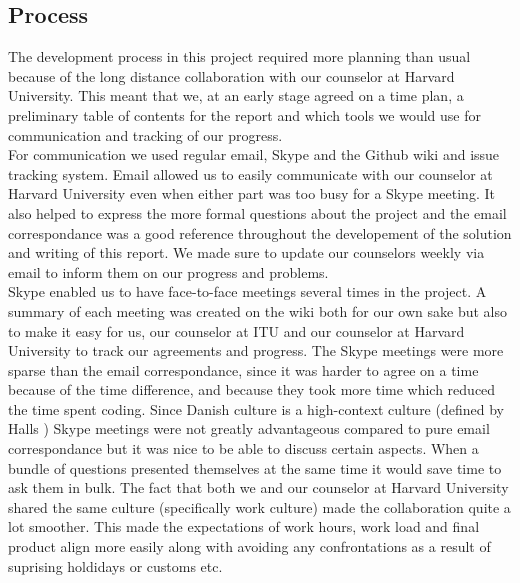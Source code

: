 
\subsection{Process}
\label{process}


The development process in this project required more planning than usual because of the long distance collaboration with our counselor at Harvard University. This meant that we, at an early stage agreed on a time plan, a preliminary table of contents for the report and which tools we would use for communication and tracking of our progress. \\

For communication we used regular email, Skype and the Github \cite{github} wiki and issue tracking system. Email allowed us to easily communicate with our counselor at Harvard University even when either part was too busy for a Skype meeting. It also helped to express the more formal questions about the project and the email correspondance was a good reference throughout the developement of the solution and writing of this report. We made sure to update our counselors weekly via email to inform them on our progress and problems.\\

Skype enabled us to have face-to-face meetings several times in the project. A summary of each meeting was created on the wiki both for our own sake but also to make it easy for us, our counselor at ITU and our counselor at Harvard University to track our agreements and progress. The Skype meetings were more sparse than the email correspondance, since it was harder to agree on a time because of the time difference, and because they took more time which reduced the time spent coding. Since Danish culture is a high-context culture (defined by Halls \cite{halls}) Skype meetings were not greatly advantageous compared to pure email correspondance but it was nice to be able to discuss certain aspects. When a bundle of questions presented themselves at the same time it would save time to ask them in bulk. The fact that both we and our counselor at Harvard University shared the same culture (specifically work culture) made the collaboration quite a lot smoother. This made the expectations of work hours, work load and final product align more easily along with avoiding any confrontations as a result of suprising holdidays or customs etc. \\

